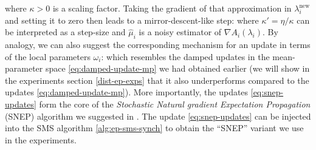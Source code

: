 %
%
where $\kappa>0$ is a scaling factor. Taking the gradient of that approximation in $\lambda_i^{\text{new}}$ and setting it to zero then leads to a mirror-descent-like step:
%
%
where $\kappa'=\eta/\kappa$ can be interpreted as a step-size and $\hat\mu_i$ is a noisy estimator of $\nabla A_i(\lambda_i)$. By analogy, we can also suggest the corresponding mechanism for an update in terms of the local parameters $\omega_i$: 
%
%
which resembles the damped updates in the mean-parameter space \eqref{eq:damped-update-mp} we had obtained earlier (we will show in the experiments section \ref{dist-ep-exps} that it also underperforms compared to the updates \eqref{eq:damped-update-mp}). 
More importantly, the updates \eqref{eq:snep-updates} form the core of the \emph{Stochastic Natural gradient Expectation Propagation} (SNEP) algorithm we suggested in \citet{hasenclever16}.
The update \eqref{eq:snep-updates} can be injected into the SMS algorithm \ref{alg:ep-sms-synch} to obtain the ``SNEP'' variant we use in the experiments.
 



%
%
%

